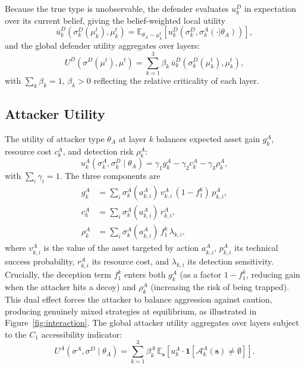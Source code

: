 \documentclass[conference]{IEEEtran}
\newcommand{\E}{\mathbb{E}}
\newcommand{\indic}{\mathbf{1}}
\begin{document}
Because the true type is unobservable, the defender evaluates $u_k^D$ in
expectation over its current belief, giving the belief-weighted local utility
\begin{equation}
\bar{u}_k^D\!\left(\sigma_k^D(\mu_k^t),\mu_k^t\right) =
\E_{\theta_A\sim\mu_k^t}\!\left[u_k^D\!\left(\sigma_k^D,
\sigma_k^A(\cdot|\theta_A)\right)\right],
\end{equation}
and the global defender utility aggregates over layers:
\begin{equation}
U^D(\sigma^D(\mu^t),\mu^t) = \sum_{k=1}^3 \beta_k\,
\bar{u}_k^D\!\left(\sigma_k^D(\mu_k^t),\mu_k^t\right),
\label{eq:util_D_global}
\end{equation}
with $\sum_k\beta_k=1$, $\beta_k>0$ reflecting the relative criticality of each
layer.

\subsection{Attacker Utility}

The utility of attacker type $\theta_A$ at layer $k$ balances expected asset
gain $g_k^A$, resource cost $c_k^A$, and detection risk $\rho_k^A$:
\begin{equation}
u_k^A(\sigma_k^A,\sigma_k^D\mid\theta_A) =
\gamma_1 g_k^A - \gamma_2 c_k^A - \gamma_3 \rho_k^A,
\label{eq:util_A}
\end{equation}
with $\sum_i\gamma_i=1$. The three components are
\begin{align}
g_k^A &= \sum_i \sigma_k^A(a_{k,i}^A)\,v_{k,i}^A\,(1-f_1^k)\,p_{k,i}^A,
\label{eq:gain}\\
c_k^A &= \sum_i \sigma_k^A(a_{k,i}^A)\,r_{k,i}^A,
\label{eq:acost}\\
\rho_k^A &= \sum_i \sigma_k^A(a_{k,i}^A)\,f_1^k\,\lambda_{k,i},
\label{eq:risk}
\end{align}
where $v_{k,i}^A$ is the value of the asset targeted by action $a_{k,i}^A$,
$p_{k,i}^A$ its technical success probability, $r_{k,i}^A$ its resource cost,
and $\lambda_{k,i}$ its detection sensitivity. Crucially, the deception term
$f_1^k$ enters both $g_k^A$ (as a factor $1-f_1^k$, reducing gain when the
attacker hits a decoy) and $\rho_k^A$ (increasing the risk of being trapped).
This dual effect forces
the attacker to balance aggression against caution, producing genuinely mixed
strategies at equilibrium, as illustrated in Figure~\ref{fig:interaction}. The global attacker utility aggregates over layers
subject to the $C_1$ accessibility indicator:
\begin{equation}
U^A(\sigma^A,\sigma^D\mid\theta_A) = \sum_{k=1}^3 \beta_k^A\,
\E_{\mathbf{s}}\!\left[u_k^A\cdot\indic[\mathcal{A}_k^A(\mathbf{s})\neq\emptyset]
\right].
\label{eq:util_A_global}
\end{equation}
\end{document}
